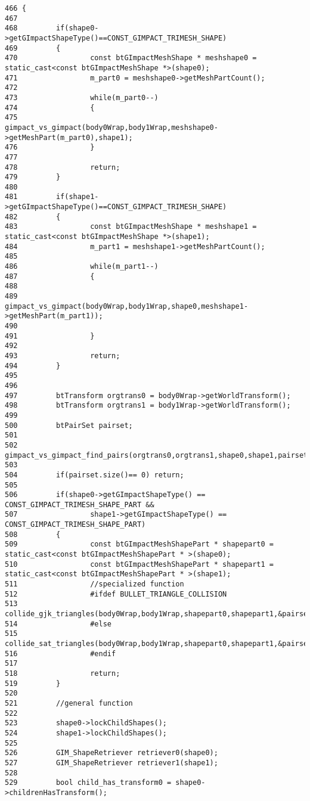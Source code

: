 \begin{Code}\begin{verbatim}466 {
467 
468         if(shape0->getGImpactShapeType()==CONST_GIMPACT_TRIMESH_SHAPE)
469         {
470                 const btGImpactMeshShape * meshshape0 = static_cast<const btGImpactMeshShape *>(shape0);
471                 m_part0 = meshshape0->getMeshPartCount();
472 
473                 while(m_part0--)
474                 {
475                         gimpact_vs_gimpact(body0Wrap,body1Wrap,meshshape0->getMeshPart(m_part0),shape1);
476                 }
477 
478                 return;
479         }
480 
481         if(shape1->getGImpactShapeType()==CONST_GIMPACT_TRIMESH_SHAPE)
482         {
483                 const btGImpactMeshShape * meshshape1 = static_cast<const btGImpactMeshShape *>(shape1);
484                 m_part1 = meshshape1->getMeshPartCount();
485 
486                 while(m_part1--)
487                 {
488 
489                         gimpact_vs_gimpact(body0Wrap,body1Wrap,shape0,meshshape1->getMeshPart(m_part1));
490 
491                 }
492 
493                 return;
494         }
495 
496 
497         btTransform orgtrans0 = body0Wrap->getWorldTransform();
498         btTransform orgtrans1 = body1Wrap->getWorldTransform();
499 
500         btPairSet pairset;
501 
502         gimpact_vs_gimpact_find_pairs(orgtrans0,orgtrans1,shape0,shape1,pairset);
503 
504         if(pairset.size()== 0) return;
505 
506         if(shape0->getGImpactShapeType() == CONST_GIMPACT_TRIMESH_SHAPE_PART &&
507                 shape1->getGImpactShapeType() == CONST_GIMPACT_TRIMESH_SHAPE_PART)
508         {
509                 const btGImpactMeshShapePart * shapepart0 = static_cast<const btGImpactMeshShapePart * >(shape0);
510                 const btGImpactMeshShapePart * shapepart1 = static_cast<const btGImpactMeshShapePart * >(shape1);
511                 //specialized function
512                 #ifdef BULLET_TRIANGLE_COLLISION
513                 collide_gjk_triangles(body0Wrap,body1Wrap,shapepart0,shapepart1,&pairset[0].m_index1,pairset.size());
514                 #else
515                 collide_sat_triangles(body0Wrap,body1Wrap,shapepart0,shapepart1,&pairset[0].m_index1,pairset.size());
516                 #endif
517 
518                 return;
519         }
520 
521         //general function
522 
523         shape0->lockChildShapes();
524         shape1->lockChildShapes();
525 
526         GIM_ShapeRetriever retriever0(shape0);
527         GIM_ShapeRetriever retriever1(shape1);
528 
529         bool child_has_transform0 = shape0->childrenHasTransform();

\end{verbatim}
\end{Code}
